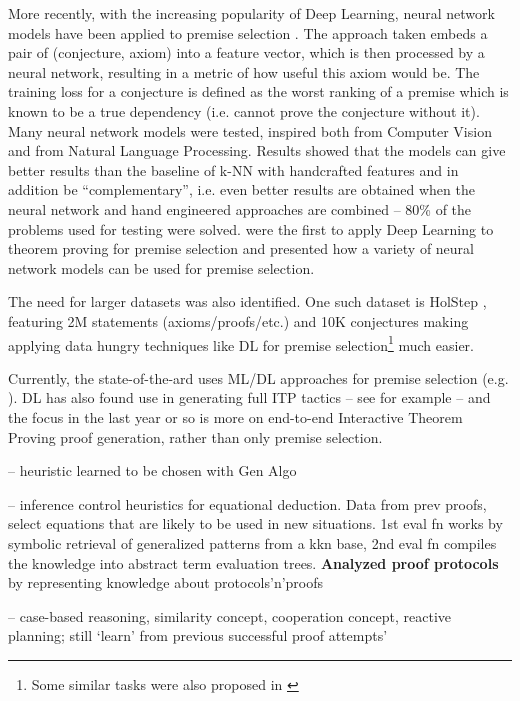 \documentclass{article}
\begin{document}
More recently, with the increasing popularity of Deep Learning, neural network
models have been applied to premise selection \citep{DeepMath}. The approach
taken embeds a pair of (conjecture, axiom) into a feature vector, which is then
processed by a neural network, resulting in a metric of how useful this axiom
would be. The training loss for a conjecture is defined as the worst ranking of
a premise which is known to be a true dependency (i.e. cannot prove the
conjecture without it). Many neural network models were tested, inspired both
from Computer Vision and from Natural Language Processing. Results showed that
the models can give better results than the baseline of k-NN with handcrafted
features and in addition be ``complementary'', i.e. even better results are
obtained when the neural network and hand engineered approaches are combined --
80\% of the problems used for testing were solved. \cite{DeepMath} were the
first to apply Deep Learning to theorem proving for premise selection and
presented how a variety of neural network models can be used for premise
selection.

The need for larger datasets was also identified. One such dataset is HolStep
\citep{HolStep}, featuring 2M statements (axioms/proofs/etc.) and 10K
conjectures making applying data hungry techniques like DL for premise
selection\footnote{Some similar tasks were also proposed in \cite{HolStep}}
much easier.

Currently, the state-of-the-ard uses ML/DL approaches for premise selection
(e.g. \cite{DeepGraph}). DL has also found use in generating full ITP
tactics --  see \cite{LearningToProveITP, GamePad} for example -- and the focus
in the last year or so is more on end-to-end Interactive Theorem Proving proof
generation, rather than only premise selection.

\cite{FuchsGenetic} -- heuristic learned to be chosen with Gen Algo

\cite{DomKnThmProv} -- inference control heuristics for equational deduction.
Data from prev proofs, select equations that are likely to be used in new
situations. 1st eval fn works by symbolic retrieval of generalized patterns
from a kkn base, 2nd eval fn compiles the knowledge into abstract term
evaluation trees. \textbf{Analyzed proof protocols} by representing knowledge
about protocols'n'proofs 

\cite{HighPerfATPAI} -- case-based reasoning, similarity concept, cooperation
concept, reactive planning; still `learn' from previous successful proof
attempts'
\end{document}
